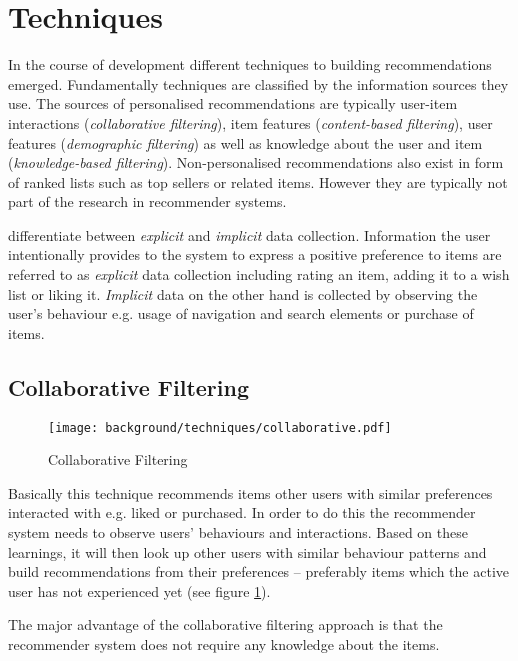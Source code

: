 \section{Techniques}

In the course of development different techniques to building recommendations emerged. Fundamentally techniques are classified by the information sources they use. The sources of personalised recommendations are typically user-item interactions (\textit{collaborative filtering}), item features (\textit{content-based filtering}), user features (\textit{demographic filtering}) as well as knowledge about the user and item (\textit{knowledge-based filtering}). Non-personalised recommendations also exist in form of ranked lists such as top sellers or related items. However they are typically not part of the research in recommender systems.

\citet{anand03} differentiate between \textit{explicit} and \textit{implicit} data collection. Information the user intentionally provides to the system to express a positive preference to items are referred to as \textit{explicit} data collection including rating an item, adding it to a wish list or liking it. \textit{Implicit} data on the other hand is collected by observing the user's behaviour e.g. usage of navigation and search elements or purchase of items.

\subsection{Collaborative Filtering}
\label{bg-tech-collaborative}

\begin{figure}[ht]
    \texttt{[image: background/techniques/collaborative.pdf]}
    \caption{Collaborative Filtering}
    \label{fig:collaborative}
\end{figure}

Basically this technique recommends items other users with similar preferences interacted with e.g. liked or purchased. In order to do this the recommender system needs to observe users' behaviours and interactions. Based on these learnings, it will then look up other users with similar behaviour patterns and build recommendations from their preferences -- preferably items which the active user has not experienced yet (see figure \ref{fig:collaborative}).

The major advantage of the collaborative filtering approach is that the recommender system does not require any knowledge about the items.

